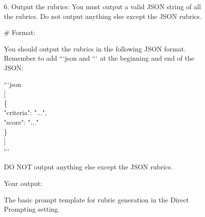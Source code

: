 \documentclass[11pt]{article}
\newcommand{\tcbtab}{\hspace*{4ex}}
\begin{document}
\begin{figure}[h]
\begin{tcolorbox}[]
6. Output the rubrics: You must output a valid JSON string of all the rubrics. Do not output anything else except the JSON rubrics.

\# Format:

You should output the rubrics in the following JSON format. 
Remember to add ```json and ``` at the beginning and end of the JSON:

```json\\
{[}\\
\tcbtab\{\\
\tcbtab\tcbtab"criteria": "...",\\
\tcbtab\tcbtab"score": "..."\\
\tcbtab\}\\
{]}\\
```

DO NOT output anything else except the JSON rubrics.

Your output:
\end{tcolorbox}
\caption{The basic prompt template for rubric generation in the Direct Prompting setting.}
\label{fig:prompt_template}
\end{figure}
\clearpage
\end{document}
